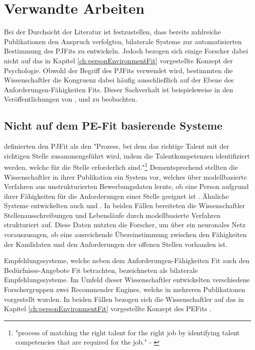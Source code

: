 \chapter{Verwandte Arbeiten}
\label{ch:verwandteArbeiten}
Bei der Durchsicht der Literatur ist festzustellen, dass bereits zahlreiche Publikationen den Anspruch verfolgten, bilaterale Systeme zur automatisierten Bestimmung des \acp{PJFit} zu entwickeln. Jedoch bezogen sich einige Forscher dabei nicht auf das in Kapitel \ref{ch:personEnvironmentFit} vorgestellte Konzept der Psychologie. Obwohl der Begriff des \acp{PJFit} verwendet wird, bestimmten die Wissenschaftler die Kongruenz dabei häufig ausschließlich auf der Ebene des Anforderungen-Fähigkeiten Fits. Dieser Sachverhalt ist beispielsweise in den Veröffentlichungen von \textcite[S. 1ff.]{luo:2019}, \textcite[S. 1ff.]{qin:2018} und \textcite[S. 1ff.]{personJobFit:2018} zu beobachten.

\section{Nicht auf dem PE-Fit basierende Systeme}
\label{ch:verwandteArbeiten:nichtAufDemPEFitBasierend}
\textcite[S. 1, Z. 1f.]{personJobFit:2018} definierten den \ac{PJFit} als den "Prozess, bei dem das richtige Talent mit der richtigen Stelle zusammengeführt wird, indem die Talentkompetenzen identifiziert werden, welche für die Stelle erforderlich sind."\footnote{"process of matching the right talent for the right job by identifying talent competencies that are required for the job." - \textcite[S. 1, Z. 1f.]{personJobFit:2018}} Dementsprechend stellten die Wissenschaftler in ihrer Publikation ein System vor, welches über modellbasierte Verfahren aus unstrukturierten Bewerbungsdaten lernte, ob eine Person aufgrund ihrer Fähigkeiten für die Anforderungen einer Stelle geeignet ist \cite[S. 1ff.]{personJobFit:2018}. Ähnliche Systeme entwickelten auch \textcite[S. 1ff.]{qin:2018} und \textcite[S. 1ff.]{luo:2019}. In beiden Fällen bereiteten die Wissenschaftler Stellenausschreibungen und Lebensläufe durch modellbasierte Verfahren strukturiert auf. Diese Daten nutzten die Forscher, um über ein neuronales Netz vorauszusagen, ob eine ausreichende Übereinstimmung zwischen den Fähigkeiten der Kandidaten und den Anforderungen der offenen Stellen vorhanden ist. 

Empfehlungssysteme, welche neben dem Anforderungen-Fähigkeiten Fit auch den Bedürfnisse-Angebote Fit betrachten, bezeichneten \textcite[S. 4]{malinowski:2006} als bilaterale Empfehlungssysteme. Im Umfeld dieser Wissenschaftler entwickelten verschiedene Forschergruppen zwei Recommender Engines, welche in mehreren Publikationen vorgestellt wurden. In beiden Fällen bezogen sich die Wissenschaftler auf das in Kapitel \ref{ch:personEnvironmentFit} vorgestellte Konzept des \acp{PEFit} \cite[S. 4f.]{keim:2007}\cite[S. 3f.]{keim:2005}\cite[S. 3f.]{malinowski:2005}\cite[S. 3f.]{malinowski:2006}.

